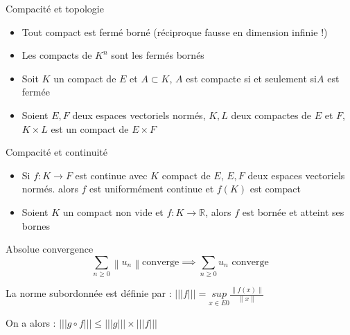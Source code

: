 \documentclass[french, a4paper, 11pt, twocolumn]{article}
\newcommand{\ssi}{si et seulement si\xspace}		%
\newcommand{\norme}[1]{\left\| #1\right\|}
\newcommand{\R}{\mathbb{R}}   %
\begin{document}
\begin{theoreme}{Compacité et topologie}
    \begin{itemize}[label=$\bullet$]
        \item Tout compact est fermé borné (réciproque fausse en dimension infinie !)
        \item Les compacts de $K^n$ sont les fermés bornés
        \item Soit $K$ un compact de $E$ et $A\subset K$, $A$ est compacte \ssi $A$ est fermée
        \item Soient $E,F$ deux espaces vectoriels normés, $K,L$ deux compactes de $E$ et $F$, $K \times L$ est un compact de $E \times F$
    \end{itemize}
\end{theoreme}

\begin{theoreme}{Compacité et continuité}
    \begin{itemize}[label=$\bullet$]
        \item Si $f : K \rightarrow F$ est continue avec $K$ compact de $E$, $E,F$ deux espaces vectoriels normés.
    alors $f$ est uniformément continue et $f(K)$ est compact
        \item Soient $K$ un compact non vide et $f : K \rightarrow \R$, alors $f$ est bornée et atteint ses bornes
    \end{itemize}
    
\end{theoreme}

\begin{theoreme}{Absolue convergence}
    \[\sum_{n \geq 0} \norme{u_n} \text{converge} \implies \sum_{n \geq 0} u_n \text{ converge}\]
\end{theoreme}

\begin{definition}
    La norme subordonnée est définie par : 
    $|||f|||=\underset{x \in E{0}}{sup} \frac{\norme{f(x)}}{\norme{x}}$

    On a alors : $|||g \circ f||| \leq |||g||| \times |||f|||$
\end{definition}
\end{document}
